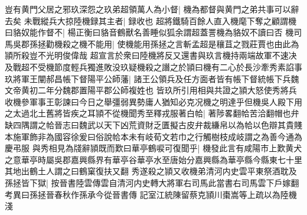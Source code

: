 豈有黄門父居之邪玖深怨之玖弟超領萬人為小督|{
	機為都督與黄門之弟共事可以辭去矣}
未戰縱兵大掠陸機録其主者|{
	録收也}
超將鐵騎百餘人直入機麾下奪之顧謂機曰貉奴能作督不|{
	楊正衡曰貉音鶴獸名善睡似狐余謂超蓋詈機為貉奴不讀曰否}
機司馬吳郡孫拯勸機殺之機不能用|{
	使機能用孫拯之言斬孟超是穰苴之戮莊賈也由此為頴所殺豈不光明俊偉哉}
超宣言於衆曰陸機將反又還書與玖言機持兩端故軍不速决及戰超不受機節度輕兵獨進敗没玖疑機殺之譖之於頴曰機有二心於長沙牽秀素諂事玖將軍王闡郝昌帳下督陽平公師藩|{
	諸王公領兵及任方面者皆有帳下督統帳下兵魏文帝黄初二年分魏郡置陽平郡公師複姓也}
皆玖所引用相與共證之頴大怒使秀將兵收機參軍事王彰諫曰今日之舉彊弱異勢庸人猶知必克况機之明達乎但機吳人殿下用之太過北土舊將皆疾之耳頴不從機聞秀至釋戎服著白帢|{
	著陟畧翻帢苦洽翻帽也弁缺四隅謂之帢晉志曰魏武以天下凶荒資財乏匱擬古皮弁裁縑帛以為帢以色辯其貴賤本施軍飾非為國容徐爰曰俗說帢本未有岐荀文若巾之行觸樹枝成岐謂之為善今通為慶弔服}
與秀相見為牋辭頴既而歎曰華亭鶴唳可復聞乎|{
	機發此言有咸陽市上歎黄犬之意華亭時屬吳郡嘉興縣界有華亭谷華亭水至唐始分嘉興縣為華亭縣今縣東七十里其地出鶴土人謂之曰鶴窠復扶又翻}
秀遂殺之頴又收機弟清河内史雲平東祭酒耽及孫拯皆下獄|{
	按晉書陸雲傳雲自清河内史轉大將軍右司馬此當書右司馬雲下戶嫁翻　考異曰孫拯晉春秋作孫承今從晉書傳}
記室江統陳留蔡克頴川棗嵩等上疏以為陸機淺

